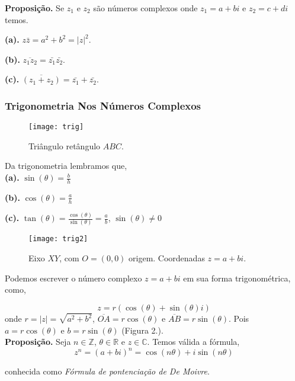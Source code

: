 \documentclass[12pt,a4paper]{article}
\begin{document}
	\textbf{Proposição.} Se $z_1$ e $z_2$ são números complexos onde $z_1 = a + bi$ e $z_2 = c + di$ temos.
	
	\textbf{(a).} $z\bar{z} = a^2 + b^2 = |z|^2$.
	
	\textbf{(b).} $\overline{z_1z_2} = \bar{z_1}\bar{z_2}$.
	
	\textbf{(c).} $\overline{(z_1 + z_2)} = \bar{z_1} + \bar{z_2}$.\\
		
	
	\subsubsection{Trigonometria Nos Números Complexos }
	

	
	\begin{figure}[h]
		\centering
		\texttt{[image: trig]}
		\caption{Triângulo retângulo $ABC$.}
		\label{fig:trig}
	\end{figure}


	Da trigonometria lembramos que,\\
	
	\textbf{(a).} $\sin(\theta) = \frac{b}{h}$
	
	\textbf{(b).} $\cos(\theta) = \frac{a}{h}$
	
	\textbf{(c).} $\tan(\theta) = \frac{\cos(\theta)}{\sin(\theta)} = \frac{a}{b}$, $\sin(\theta) \neq 0$\\
	
	\begin{figure}[h]
		\centering
		\texttt{[image: trig2]}
		\caption{Eixo $XY$, com $\mathit{O} = (0,0)$ origem. Coordenadas $z = a + bi$.}
		\label{fig:trig}
	\end{figure}
	
	
	Podemos escrever o número complexo $z = a + bi$ em sua forma trigonométrica, como,
	
	$$z = r( \cos (\theta) + \sin (\theta)i)$$
	\noindent
	onde $r = |z| = \sqrt{a^2 + b^2}$, $\overline{OA} = r\cos(\theta)$ e $\overline{AB} = r\sin(\theta)$.
	Pois $a = r\cos(\theta)$ e $b = r\sin(\theta)$ (Figura 2.).\\
	
	\noindent
	\textbf{Proposição.} Seja $n \in \mathbb{Z}$, $\theta \in \mathbb{R}$ e $z \in \mathbb{C}$. Temos válida a fórmula,
	$$  z^n = \left( a + bi \right)^n = \cos(n\theta) + i\sin(n\theta)$$

	\noindent
	conhecida como \textit{Fórmula de pontenciação de De Moivre}.
	
\end{document}
